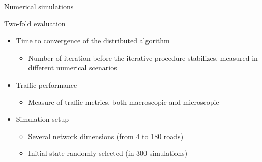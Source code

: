 \begin{frame}{Numerical simulations}
    \begin{exampleblock}{Two-fold evaluation}
    \begin{itemize}
    \item Time to convergence of the distributed algorithm
    \begin{itemize}
    \item Number of iteration before the iterative procedure stabilizes, measured in different numerical scenarios
    \end{itemize}
    \end{itemize}
    
    \begin{itemize}
    \item Traffic performance
    \begin{itemize}
        \item Measure of traffic metrics, both macroscopic and microscopic
    \end{itemize}
    \item Simulation setup
    \begin{itemize}
        \item Several network dimensions (from 4 to 180 roads)
        \item Initial state randomly selected (in 300 simulations)
        \end{itemize}
    \end{itemize}
    \end{exampleblock}
\end{frame}